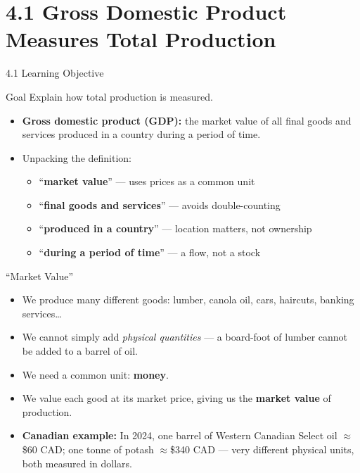 \documentclass[aspectratio=169]{beamer}
\begin{document}
\section{4.1 Gross Domestic Product Measures Total Production}

\begin{frame}{4.1 Learning Objective}
\transfade
\begin{block}{Goal}
Explain how total production is measured.
\end{block}
\begin{itemize}
  \item \textbf{Gross domestic product (GDP):} the market value of all final goods and services produced in a country during a period of time.
  \item Unpacking the definition:
  \begin{itemize}
    \item ``\textbf{market value}'' --- uses prices as a common unit
    \item ``\textbf{final goods and services}'' --- avoids double-counting
    \item ``\textbf{produced in a country}'' --- location matters, not ownership
    \item ``\textbf{during a period of time}'' --- a flow, not a stock
  \end{itemize}
\end{itemize}
\end{frame}

\begin{frame}{``Market Value''}
\transfade
\begin{itemize}
  \item We produce many different goods: lumber, canola oil, cars, haircuts, banking services\ldots
  \item We cannot simply add \emph{physical quantities} --- a board-foot of lumber cannot be added to a barrel of oil.
  \item We need a \alert{common unit}: \textbf{money}.
  \item We value each good at its \alert{market price}, giving us the \textbf{market value} of production.
  \item \textbf{Canadian example:} In 2024, one barrel of Western Canadian Select oil $\approx$\$60 CAD; one tonne of potash $\approx$\$340 CAD --- very different physical units, both measured in dollars.
\end{itemize}
\end{frame}
\end{document}

